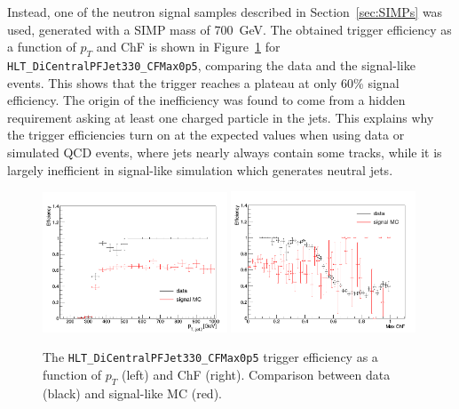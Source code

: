 Instead, one of the neutron signal samples described in Section~\ref{sec:SIMPs} was used, generated with a \ac{SIMP} mass of \SI{700}{GeV}. The obtained trigger efficiency as a function of $p_{T}$ and ChF is shown in Figure~\ref{fig:efficiencies_simp_data} for \texttt{HLT\_DiCentralPFJet330\_CFMax0p5}, comparing the data and the signal-like events. This shows that the trigger reaches a plateau at only 60\% signal efficiency. The origin of the inefficiency was found to come from a hidden requirement asking at least one charged particle in the jets. This explains why the trigger efficiencies turn on at the expected values when using data or simulated \ac{QCD} events, where jets nearly always contain some tracks, while it is largely inefficient in signal-like simulation which generates neutral jets.

\begin{figure}[ht]
  \centering
  \includegraphics[width=0.49\textwidth]{figures/trigger/pt_eff_05_DataSIMP.png}\hfill%
  \includegraphics[width=0.49\textwidth]{figures/trigger/chf_eff_05_DataSIMP.png}
  \caption{The \texttt{HLT\_DiCentralPFJet330\_CFMax0p5} trigger efficiency as a function of $p_{T}$ (left) and ChF (right). Comparison between data (black) and signal-like MC (red).}
  \label{fig:efficiencies_simp_data}
\end{figure}

